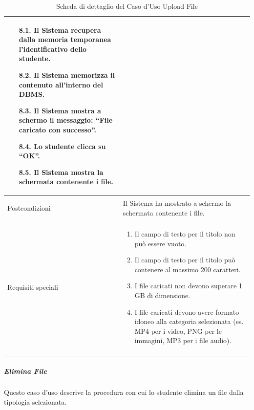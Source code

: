 \documentclass[12pt,a4paper]{article}
\begin{document}
\begin{longtable}{|
>{\columncolor{unipablue}\color{white}\bfseries\raggedright\arraybackslash}p{3.4cm}|
>{\raggedright\arraybackslash}p{11.1cm}|}
\begin{enumerate}[topsep=0pt,itemsep=0.15em,parsep=0pt,partopsep=0pt]
    \begin{itemize}[topsep=0.15em,itemsep=0.1em,parsep=0pt,partopsep=0pt]
        \item[8.1.] Il Sistema recupera dalla memoria temporanea l'identificativo dello studente.
        \item[8.2.] Il Sistema memorizza il contenuto all'interno del DBMS.
        \item[8.3.] Il Sistema mostra a schermo il messaggio: ``File caricato con successo''.
        \item[8.4.] Lo studente clicca su ``OK''.
        \item[8.5.] Il Sistema mostra la schermata contenente i file.
    \end{itemize}
\end{enumerate} \\ \hline
Postcondizioni & Il Sistema ha mostrato a schermo la schermata contenente i file. \\ \hline
Requisiti speciali &
\begin{enumerate}[topsep=0.2em,itemsep=0.15em,parsep=0pt,partopsep=0pt]
    \item Il campo di testo per il titolo non può essere vuoto.
    \item Il campo di testo per il titolo può contenere al massimo 200 caratteri.
    \item I file caricati non devono superare 1 GB di dimensione.
    \item I file caricati devono avere formato idoneo alla categoria selezionata (es. MP4 per i video, PNG per le immagini, MP3 per i file audio).
\end{enumerate} \\ \hline
\caption{Scheda di dettaglio del Caso d'Uso Upload File}
\label{tab:uc_upload_file}\\
\end{longtable}
\normalsize

\newpage
\subparagraph{Elimina File}

Questo caso d'uso descrive la procedura con cui lo studente elimina un file dalla tipologia selezionata.
\end{document}
